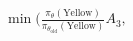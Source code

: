 \documentclass[preview]{standalone}
\begin{document}
\begin{align*}
\min \big(\frac{\pi_\theta(\text{Yellow})}{\pi_{\theta_{\text{old}}}(\text{Yellow})} A_3,
\end{align*}
\end{document}
